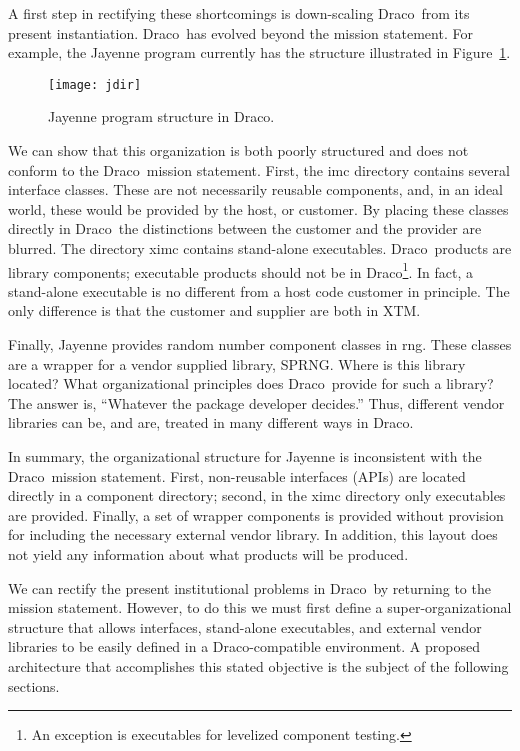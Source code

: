 \documentclass[note]{ResearchNote_pdf}
\newcommand{\draco}{\textsf{Draco}}
\newcommand{\pkg}[1]{\textsf{#1}}
\begin{document}
A first step in rectifying these shortcomings is down-scaling \draco\ 
from its present instantiation.  \draco\ has evolved beyond the
mission statement.  For example, the \pkg{Jayenne} program currently
has the structure illustrated in Figure~\ref{fig:Jayenne}.
\begin{figure}
  \centerline{\texttt{[image: jdir]}}
  \caption{\pkg{Jayenne} program structure in \draco.}
  \label{fig:Jayenne}
\end{figure}
We can show that this organization is both poorly structured and does
not conform to the \draco\ mission statement.  First, the \pkg{imc}
directory contains several interface classes.  These are not
necessarily reusable components, and, in an ideal world, these would
be provided by the host, or customer.  By placing these classes
directly in \draco\ the distinctions between the customer and the
provider are blurred.  The directory \pkg{ximc} contains stand-alone
executables.  \draco\ products are library components; executable
products should not be in \draco\footnote{An exception is executables
  for levelized component testing.}.  In fact, a stand-alone
executable is no different from a host code customer in principle.
The only difference is that the customer and supplier are both in XTM.

Finally, \pkg{Jayenne} provides random number component classes in
\pkg{rng}.  These classes are a wrapper for a vendor supplied library,
\pkg{SPRNG}.  Where is this library located?  What organizational
principles does \draco\ provide for such a library?  The answer is,
``Whatever the package developer decides.''  Thus, different vendor
libraries can be, and are, treated in many different ways in \draco.

In summary, the organizational structure for \pkg{Jayenne} is
inconsistent with the \draco\ mission statement.  First, non-reusable
interfaces (APIs) are located directly in a component directory;
second, in the \pkg{ximc} directory only executables are provided.
Finally, a set of wrapper components is provided without provision for
including the necessary external vendor library.  In addition,
this layout does not yield any information about what products will
be produced.

We can rectify the present institutional problems in \draco\ by
returning to the mission statement.  However, to do this we must first 
define a super-organizational structure that allows interfaces,
stand-alone executables, and external vendor libraries to be easily
defined in a \draco-compatible environment.  A proposed architecture
that accomplishes this stated objective is the subject of the
following sections.
\end{document}
